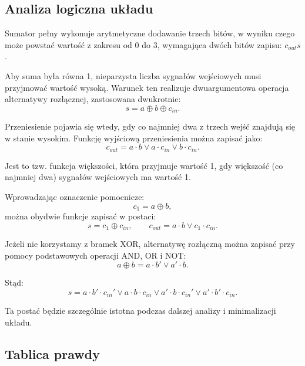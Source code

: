 \subsection{Analiza logiczna układu}

Sumator pełny wykonuje arytmetyczne dodawanie trzech bitów, w wyniku czego może powstać wartość z zakresu od 0 do 3, wymagająca dwóch bitów zapisu: $c_{out}s$.

Aby suma była równa 1, nieparzysta liczba sygnałów wejściowych musi przyjmować wartość wysoką. Warunek ten realizuje dwuargumentowa operacja alternatywy rozłącznej, zastosowana dwukrotnie:
\begin{equation*}
s = a \oplus b \oplus c_{in}.
\end{equation*}

Przeniesienie pojawia się wtedy, gdy co najmniej dwa z trzech wejść znajdują się w stanie wysokim. Funkcję wyjściową przeniesienia można zapisać jako:
\begin{equation*}
c_{out} = a \cdot b \vee a \cdot c_{in} \vee b \cdot c_{in}.
\end{equation*}

Jest to tzw. funkcja większości, która przyjmuje wartość 1, gdy większość (co najmniej dwa) sygnałów wejściowych ma wartość 1.

Wprowadzając oznaczenie pomocnicze:
\begin{equation*}
c_1 = a \oplus b,
\end{equation*}
można obydwie funkcje zapisać w postaci:
\begin{equation*}
s = c_1 \oplus c_{in}, \qquad c_{out} = a \cdot b \vee c_1 \cdot c_{in}.
\end{equation*}

Jeżeli nie korzystamy z bramek XOR, alternatywę rozłączną można zapisać przy pomocy podstawowych operacji AND, OR i NOT:
\begin{equation*}
a \oplus b = a \cdot b' \vee a' \cdot b.
\end{equation*}

Stąd:
\begin{equation*}
s = a \cdot b' \cdot c_{in}' \vee a \cdot b \cdot c_{in} \vee a' \cdot b \cdot c_{in}' \vee a' \cdot b' \cdot c_{in}.
\end{equation*}

Ta postać będzie szczególnie istotna podczas dalszej analizy i minimalizacji układu.

\subsection{Tablica prawdy}

